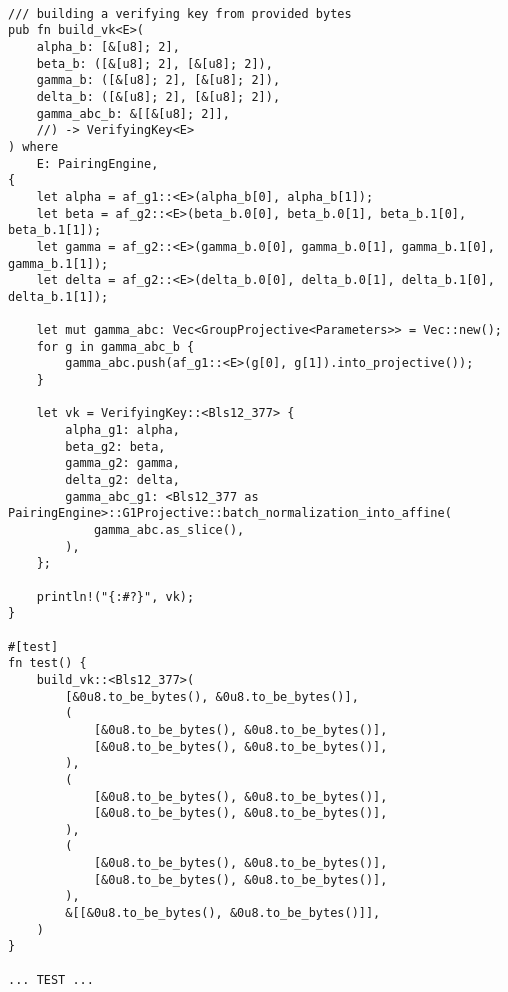 \documentclass{article}
\begin{document}
\begin{lstlisting}

/// building a verifying key from provided bytes
pub fn build_vk<E>(
    alpha_b: [&[u8]; 2],
    beta_b: ([&[u8]; 2], [&[u8]; 2]),
    gamma_b: ([&[u8]; 2], [&[u8]; 2]),
    delta_b: ([&[u8]; 2], [&[u8]; 2]),
    gamma_abc_b: &[[&[u8]; 2]],
    //) -> VerifyingKey<E>
) where
    E: PairingEngine,
{
    let alpha = af_g1::<E>(alpha_b[0], alpha_b[1]);
    let beta = af_g2::<E>(beta_b.0[0], beta_b.0[1], beta_b.1[0], beta_b.1[1]);
    let gamma = af_g2::<E>(gamma_b.0[0], gamma_b.0[1], gamma_b.1[0], gamma_b.1[1]);
    let delta = af_g2::<E>(delta_b.0[0], delta_b.0[1], delta_b.1[0], delta_b.1[1]);

    let mut gamma_abc: Vec<GroupProjective<Parameters>> = Vec::new();
    for g in gamma_abc_b {
        gamma_abc.push(af_g1::<E>(g[0], g[1]).into_projective());
    }

    let vk = VerifyingKey::<Bls12_377> {
        alpha_g1: alpha,
        beta_g2: beta,
        gamma_g2: gamma,
        delta_g2: delta,
        gamma_abc_g1: <Bls12_377 as PairingEngine>::G1Projective::batch_normalization_into_affine(
            gamma_abc.as_slice(),
        ),
    };

    println!("{:#?}", vk);
}

#[test]
fn test() {
    build_vk::<Bls12_377>(
        [&0u8.to_be_bytes(), &0u8.to_be_bytes()],
        (
            [&0u8.to_be_bytes(), &0u8.to_be_bytes()],
            [&0u8.to_be_bytes(), &0u8.to_be_bytes()],
        ),
        (
            [&0u8.to_be_bytes(), &0u8.to_be_bytes()],
            [&0u8.to_be_bytes(), &0u8.to_be_bytes()],
        ),
        (
            [&0u8.to_be_bytes(), &0u8.to_be_bytes()],
            [&0u8.to_be_bytes(), &0u8.to_be_bytes()],
        ),
        &[[&0u8.to_be_bytes(), &0u8.to_be_bytes()]],
    )
}

... TEST ...


\end{lstlisting}
\end{document}
